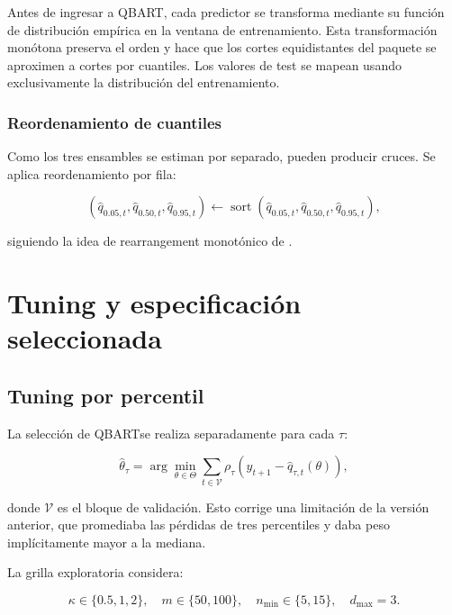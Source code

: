 \documentclass[11pt,a4paper]{article}
\newcommand{\qbart}{\textsc{QBART}}
\begin{document}
Antes de ingresar a \qbart, cada predictor se transforma mediante su función
de distribución empírica en la ventana de entrenamiento. Esta transformación
monótona preserva el orden y hace que los cortes equidistantes del paquete
se aproximen a cortes por cuantiles. Los valores de test se mapean usando
exclusivamente la distribución del entrenamiento.

\subsubsection{Reordenamiento de cuantiles}

Como los tres ensambles se estiman por separado, pueden producir cruces. Se
aplica reordenamiento por fila:

\begin{equation}
  \left(
  \widehat q_{0.05,t},
  \widehat q_{0.50,t},
  \widehat q_{0.95,t}
  \right)
  \leftarrow
  \operatorname{sort}
  \left(
  \widehat q_{0.05,t},
  \widehat q_{0.50,t},
  \widehat q_{0.95,t}
  \right),
\end{equation}

siguiendo la idea de rearrangement monotónico de
\cite{chernozhukov2010}.

\section{Tuning y especificación seleccionada}

\subsection{Tuning por percentil}

La selección de \qbart se realiza separadamente para cada \(\tau\):

\begin{equation}
  \widehat{\theta}_{\tau}
  =
  \arg\min_{\theta\in\Theta}
  \sum_{t\in\mathcal V}
  \rho_{\tau}
  \left(
  y_{t+1}-\widehat q_{\tau,t}(\theta)
  \right),
\end{equation}

donde \(\mathcal V\) es el bloque de validación. Esto corrige una limitación
de la versión anterior, que promediaba las pérdidas de tres percentiles y
daba peso implícitamente mayor a la mediana.

La grilla exploratoria considera:

\begin{equation}
  \kappa\in\{0.5,1,2\},\quad
  m\in\{50,100\},\quad
  n_{\min}\in\{5,15\},\quad
  d_{\max}=3.
\end{equation}
\end{document}
